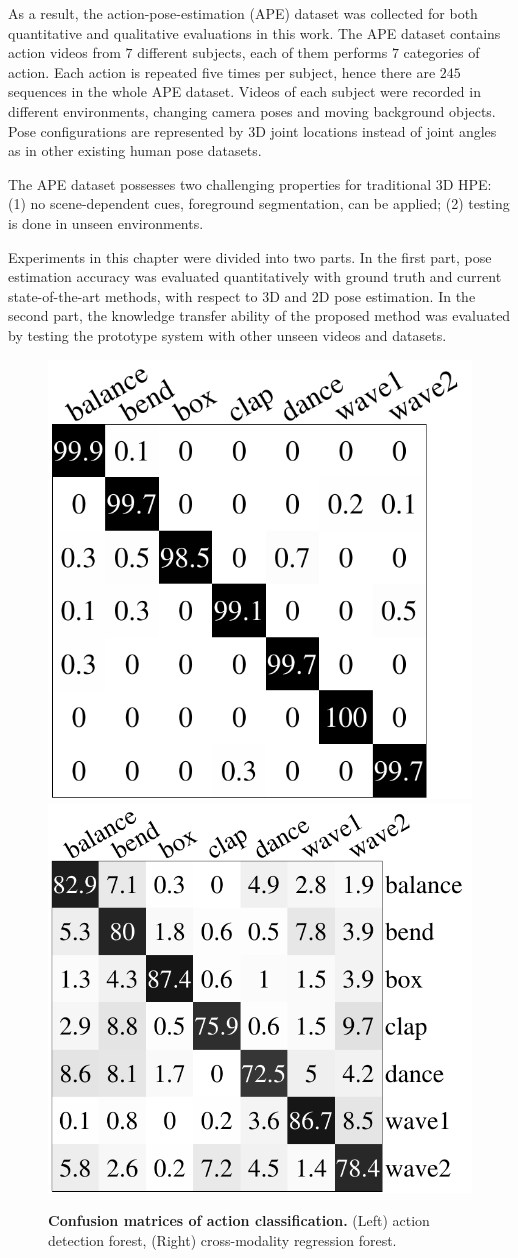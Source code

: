 As a result, the action-pose-estimation (APE) dataset was collected for both quantitative and qualitative evaluations in this work. The APE dataset contains action videos from $7$ different subjects, each of them performs $7$ categories of action. Each action is repeated five times per subject, hence there are $245$ sequences in the whole APE dataset. 
Videos of each subject were recorded in different environments, changing camera poses and moving background objects. Pose configurations are represented by 3D joint locations instead of joint angles as in other existing human pose datasets.   

The APE dataset possesses two challenging properties for traditional 3D HPE: (1) no scene-dependent cues, \eg foreground segmentation, can be applied; (2) testing is done in unseen environments.

Experiments in this chapter were divided into two parts. In the first part, pose estimation accuracy was evaluated quantitatively with ground truth and current state-of-the-art methods, with respect to 3D and 2D pose estimation. In the second part, the knowledge transfer ability of the proposed method was evaluated by testing the prototype system with other unseen videos and datasets. 

\begin{figure}[ht]
	\centering
	\includegraphics[height=0.30\linewidth]{fig/body/confm_detection.pdf} \hspace{1cm} 
	\includegraphics[height=0.30\linewidth]{fig/body/confm_regression.pdf}
	\caption{\textbf{Confusion matrices of action classification.} (Left) action detection forest, (Right) cross-modality regression forest.} 
	\label{fig/body/confm}
\end{figure}



